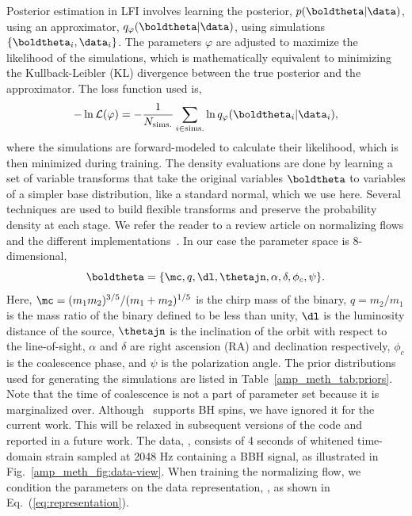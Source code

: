\begin{refsection}
Posterior estimation in LFI involves learning the posterior, $p(\boldtheta \vert \data)$, using an approximator, $q_{\varphi}(\boldtheta \vert \data)$, using simulations $\{\boldtheta_i, \data_i\}$. 
The parameters $\varphi$ are adjusted to maximize the likelihood of the simulations, which is mathematically equivalent to minimizing the Kullback-Leibler (KL) divergence between the true posterior and the approximator. 
The loss function used is,
\begin{equation}
    - \ln \mathcal{L}(\varphi) = - \frac{1}{N_{\mathrm{sims.}}}\sum_{i \in \mathrm{sims.}} \ln q_{\varphi}(\boldtheta_i \vert \data_i),
    \label{eq:log_likelihood}
\end{equation}
where the simulations are forward-modeled to calculate their likelihood, which is then minimized during training.
The density evaluations are done by learning a set of variable transforms that take the original variables $\boldtheta$ to variables of a simpler base distribution, like a standard normal, which we use here. 
Several techniques are used to build flexible transforms and preserve the probability density at each stage. 
We refer the reader to a review article on normalizing flows and the different implementations~\cite{papamakarios2021normalizing}.
In our case the parameter space is 8-dimensional,
\begin{equation}
    \boldtheta = \{\mc, q, \dl, \thetajn, \alpha, \delta, \phi_c, \psi \}.
    \label{eq:parameters}
\end{equation}
Here, $\mc = (m_1m_2)^{3/5}/(m_1 + m_2)^{1/5}$ is the chirp mass of the binary, $q = m_2/m_1$ is the mass ratio of the binary defined to be less than unity, $\dl$ is the luminosity distance of the source, $\thetajn$ is the inclination of the orbit with respect to the line-of-sight, $\alpha$ and $\delta$ are right ascension (RA) and declination respectively, $\phi_c$ is the coalescence phase, and $\psi$ is the polarization angle. 
The prior distributions used for generating the simulations are listed in Table~\ref{amp_meth_tab:priors}.
Note that the time of coalescence is not a part of parameter set because it is marginalized over.
Although \phenomd~supports BH spins, we have ignored it for the current work. 
This will be relaxed in subsequent versions of the code and reported in a future work. The data, \data, consists of 4 seconds of whitened time-domain strain sampled at 2048 Hz containing a BBH signal, as illustrated in Fig.~\ref{amp_meth_fig:data-view}. 
When training the normalizing flow, we condition the parameters on the data representation, \smallgamma, as shown in Eq.~(\ref{eq:representation}). 

\end{refsection}
